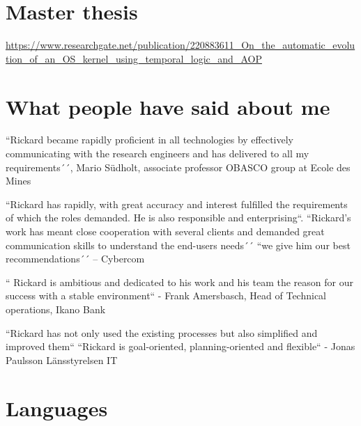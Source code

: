\documentclass[11pt,a4paper,sans]{moderncv}
\begin{document}
{\section{Master thesis}
\url{https://www.researchgate.net/publication/220883611\_On_the_automatic_evolution_of_an_OS_kernel_using_temporal_logic_and_AOP}

\section{What people have said about me}
\large 

\begin{quotelist}
    \item
    ``Rickard became rapidly proficient in all technologies by effectively communicating with the research engineers and has delivered to all my requirements´´,
      Mario Südholt, associate professor OBASCO group at Ecole des Mines 
\item
        ``Rickard has rapidly, with great accuracy and interest fulfilled the requirements of which the roles demanded.  He is also responsible and enterprising``. ``Rickard’s work has meant close cooperation with several clients and demanded great communication skills to understand the end-users needs´´ 
        ``we give him our best recommendations´´ – Cybercom 
\item     
        `` Rickard is ambitious and dedicated to his work and his team the reason for our success with a stable environment``  - Frank Amersbasch, Head of Technical operations, Ikano Bank 
\item  ``Rickard has not only used the existing processes but also simplified and improved them`` ``Rickard is goal-oriented, planning-oriented and flexible``  - Jonas Paulsson Länsstyrelsen IT 
       
  \end{quotelist}

\section{Languages}

}
\end{document}
